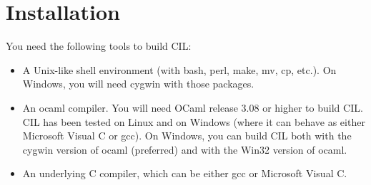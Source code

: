 \documentclass{article}
\begin{document}
\section{Installation}

 You need the following tools to build CIL:
\begin{itemize}
\item A Unix-like shell environment (with bash, perl, make, mv, cp,
  etc.). On Windows, you will need cygwin with those packages.
\item An ocaml compiler. You will need OCaml release 3.08 or higher to build
CIL. CIL has been tested on Linux and on Windows (where it can behave as
either Microsoft Visual C or gcc). On Windows, you can build CIL both with the
cygwin version of ocaml (preferred) and with the Win32 version of ocaml.
\item An underlying C compiler, which can be either gcc or Microsoft Visual C.
\end{itemize}
\end{document}
